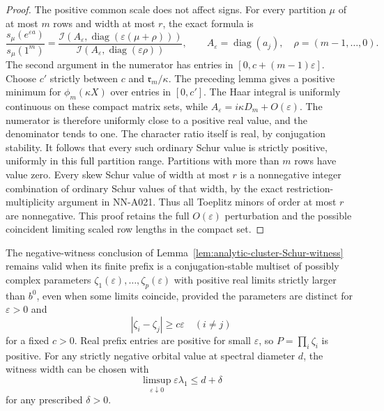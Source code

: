 \begin{proof}
The positive common scale does not affect signs. For every partition
$\mu$ of at most $m$ rows and width at most $r$, the exact formula is
\[
 \frac{s_\mu(e^{\varepsilon a})}{s_\mu(1^m)}
       =\frac{\mathcal I(A_\varepsilon,
                       \operatorname{diag}(\varepsilon(\mu+\rho)))}
              {\mathcal I(A_\varepsilon,
                       \operatorname{diag}(\varepsilon\rho))},
            \qquad A_\varepsilon=\operatorname{diag}(a_j),
            \quad \rho=(m-1,\ldots,0).
\]
The second argument in the numerator has entries in
$[0,c+(m-1)\varepsilon]$. Choose $c'$ strictly between $c$ and
$\mathfrak r_m/\kappa$. The preceding lemma gives a positive
minimum for $\phi_m(\kappa X)$ over entries in $[0,c']$.
The Haar integral is uniformly continuous on these compact matrix
sets, while $A_\varepsilon=i\kappa D_m+O(\varepsilon)$.
The numerator is therefore uniformly close to a positive real value,
and the denominator tends to one. The character ratio itself is real,
by conjugation stability. It follows that every such ordinary Schur
value is strictly positive, uniformly in this full partition range.
Partitions with more than $m$ rows have value zero.
Every skew Schur value of width at most $r$ is a nonnegative integer
combination of ordinary Schur values of that width, by the exact
restriction-multiplicity argument in NN-A021. Thus all Toeplitz minors
of order at most $r$ are nonnegative. This proof retains the full
$O(\varepsilon)$ perturbation and the possible coincident limiting
scaled row lengths in the compact set.
\end{proof}

\begin{lemma}
\label{lem:analytic-coalescent-prefix-isolation}
The negative-witness conclusion of
Lemma~\ref{lem:analytic-cluster-Schur-witness} remains valid when its
finite prefix is a conjugation-stable multiset of possibly complex
parameters $\zeta_1(\varepsilon),\ldots,\zeta_p(\varepsilon)$ with
positive real limits strictly larger than $b^0$, even when some limits
coincide, provided the parameters are distinct for $\varepsilon>0$ and
\[
                 |\zeta_i-\zeta_j|\ge c\varepsilon
                         \quad(i\ne j)
\]
for a fixed $c>0$. Real prefix entries are positive for small
$\varepsilon$, so $P=\prod_i\zeta_i$ is positive. For any strictly
negative orbital value at spectral diameter $d$, the witness width
can be chosen with
\[
                   \limsup_{\varepsilon\downarrow0}
                               \varepsilon\lambda_1\le d+\delta
\]
for any prescribed $\delta>0$.
\end{lemma}


